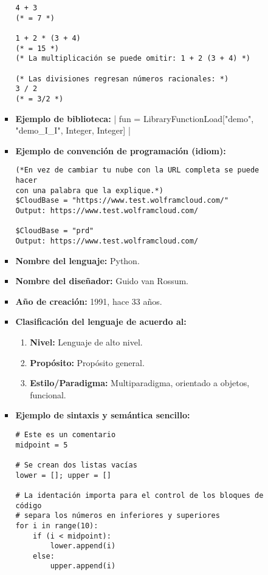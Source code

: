 \documentclass[11pt,letterpaper]{article}
\begin{document}
\begin{enumerate}
\begin{itemize}
\begin{itemize}
\begin{verbatim}
4 + 3
(* = 7 *)

1 + 2 * (3 + 4)
(* = 15 *)
(* La multiplicación se puede omitir: 1 + 2 (3 + 4) *)

(* Las divisiones regresan números racionales: *)
3 / 2
(* = 3/2 *)
\end{verbatim}
                  \item \textbf{Ejemplo de biblioteca:}
                  | fun = LibraryFunctionLoad["demo", "demo_I_I", {Integer}, Integer] |
                  \item \textbf{Ejemplo de convención de programación (idiom):}
\begin{verbatim}
(*En vez de cambiar tu nube con la URL completa se puede hacer
con una palabra que la explique.*)
$CloudBase = "https://www.test.wolframcloud.com/"
Output: https://www.test.wolframcloud.com/

$CloudBase = "prd"
Output: https://www.test.wolframcloud.com/
\end{verbatim}
                \end{itemize}
                \begin{itemize}
                  \item \textbf{Nombre del lenguaje:} Python.
                  \item \textbf{Nombre del diseñador:} Guido van Rossum.
                  \item \textbf{Año de creación:} 1991, hace 33 años.
                  \item \textbf{Clasificación del lenguaje de acuerdo al:}
                        \begin{enumerate}
                          \item \textbf{Nivel:} Lenguaje de alto nivel.
                          \item \textbf{Propósito:} Propósito general.
                          \item \textbf{Estilo/Paradigma:} Multiparadigma,
                                orientado a objetos, funcional.
                        \end{enumerate}
                  \item \textbf{Ejemplo de sintaxis y semántica sencillo:}
\begin{verbatim}
# Este es un comentario
midpoint = 5

# Se crean dos listas vacías
lower = []; upper = []

# La identación importa para el control de los bloques de código
# separa los números en inferiores y superiores
for i in range(10):
    if (i < midpoint):
        lower.append(i)
    else:
        upper.append(i)


\end{verbatim}
\end{itemize}
\end{itemize}
\end{enumerate}
\end{document}
